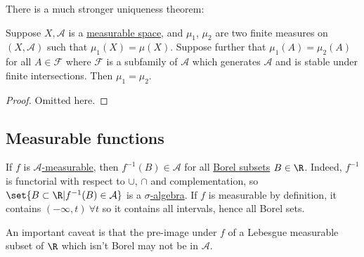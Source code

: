 \documentclass{article}
\newcommand{\1}[1]{\mathbbm{1}_{#1}}
\begin{document}
There is a much stronger uniqueness theorem:
\begin{thm}
    Suppose $X, \mathcal{A}$ is a \hyperlink{def:measurableSpace}{measurable space}, and $\mu_1$, $\mu_2$ are two finite measures on $(X, \mathcal{A})$ such that $\mu_1(X) = \mu(X)$.
    Suppose further that $\mu_1(A) = \mu_2(A)$ for all $A \in \mathcal{F}$ where $\mathcal{F}$ is a subfamily of $\mathcal{A}$ which generates $\mathcal{A}$ and is stable under finite intersections.
    Then $\mu_1 = \mu_2$.
\end{thm}


\begin{proof}
    Omitted here.
\end{proof}


\subsection{Measurable functions}

\begin{remark}
    If $f$ is \hyperlink{def:measurableFunctoR}{$\mathcal{A}$-measurable}, then $f^{-1}(B) \in \mathcal{A}$ for all \hyperlink{def:borelAlg}{Borel subsets} $B \in \R$.
    Indeed, $f^{-1}$ is functorial with respect to $\cup$, $\cap$ and complementation, so $\set{B \subset \R | f^{-1} (B) \in \mathcal{A}}$ is a \hyperlink{def:sigAlg}{$\sigma$-algebra}.
    If $f$ is measurable by definition, it contains $(-\infty, t) \ \forall t$ so it contains all intervals, hence all Borel sets.

    An important caveat is that the pre-image under $f$ of a Lebesgue measurable subset of $\R$ which isn't Borel may not be in $\mathcal{A}$.
\end{remark}
\end{document}
